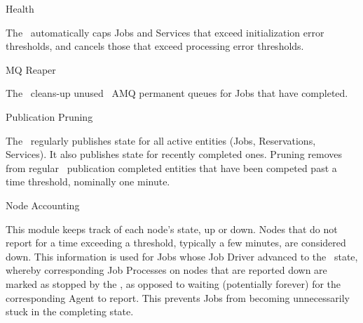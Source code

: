     \begin{description}
    
      \item Health
      
      The \varOrchestrator~automatically caps Jobs and Services that exceed initialization
      error thresholds, and cancels those that exceed processing error thresholds.
      
      \item MQ Reaper
      
      The \varOrchestrator~cleans-up unused \varJobDriver~AMQ permanent queues for Jobs that have completed.
      
      \item Publication Pruning
      
      The \varOrchestrator~regularly publishes state for all active entities (Jobs, Reservations,
      Services).  It also publishes state for recently completed ones. Pruning removes
      from regular \varOrchestrator~publication completed entities that have been competed past a
      time threshold, nominally one minute.
           
      \item Node Accounting
      
      This module keeps track of each node's state, up or down.  Nodes that do 
      not report for a time exceeding a threshold, typically a few minutes, 
      are considered down. This information is used for Jobs whose Job Driver
      advanced to the \varCompleted~state, whereby corresponding Job Processes on 
      nodes that are reported down are marked as stopped by the \varOrchestrator, as opposed 
      to waiting (potentially forever) for the corresponding Agent to report.
      This prevents Jobs from becoming unnecessarily stuck in the completing
      state.
      
    \end{description} 
    
